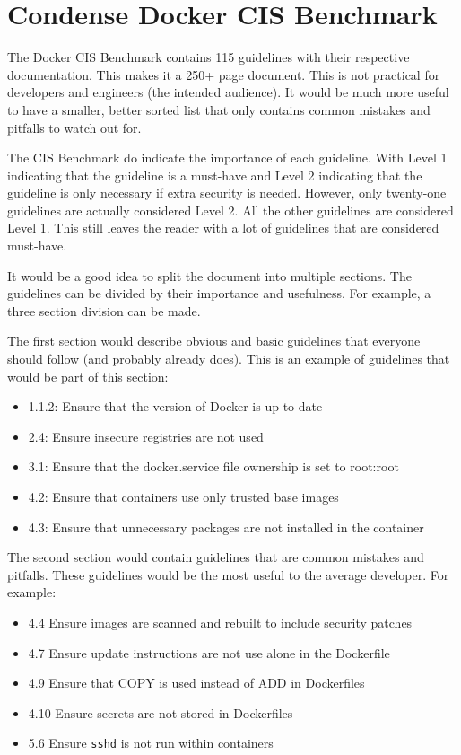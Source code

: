 \section{Condense Docker CIS Benchmark}

The Docker CIS Benchmark contains 115 guidelines with their respective documentation.
This makes it a 250+ page document. This is not practical for developers and engineers (the intended audience). It would be much more useful to have a smaller, better sorted list that only contains common mistakes and pitfalls to watch out for.

\hfill

The CIS Benchmark do indicate the importance of each guideline.
With Level 1 indicating that the guideline is a must-have and Level 2 indicating that the guideline is only necessary if extra security is needed. However, only twenty-one guidelines are actually considered Level 2. All the other guidelines are considered Level 1. This still leaves the reader with a lot of guidelines that are considered must-have.

\hfill

It would be a good idea to split the document into multiple sections. The guidelines can be divided by their importance and usefulness. For example, a three section division can be made.

\hfill

The first section would describe obvious and basic guidelines that everyone should follow (and probably already does). This is an example of guidelines that would be part of this section:
\begin{itemize}
    \item 1.1.2: Ensure that the version of Docker is up to date
    \item 2.4: Ensure insecure registries are not used
    \item 3.1: Ensure that the docker.service file ownership is set to root:root
    \item 4.2: Ensure that containers use only trusted base images
    \item 4.3: Ensure that unnecessary packages are not installed in the container
\end{itemize}

\hfill

The second section would contain guidelines that are common mistakes and pitfalls. These guidelines would be the most useful to the average developer. For example:
\begin{itemize}
    \item 4.4 Ensure images are scanned and rebuilt to include security patches
    \item 4.7 Ensure update instructions are not use alone in the Dockerfile
    \item 4.9 Ensure that COPY is used instead of ADD in Dockerfiles
    \item 4.10 Ensure secrets are not stored in Dockerfiles
    \item 5.6 Ensure \lstinline{sshd} is not run within containers
\end{itemize}

